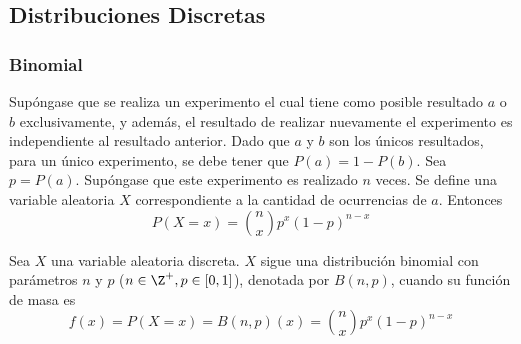 \subsection{Distribuciones Discretas}
\subsubsection{Binomial}
\label{dist:binom}
Supóngase que se realiza un experimento el cual tiene como posible
resultado $a$ o $b$ exclusivamente, y además, el resultado
de realizar nuevamente el experimento es independiente al
resultado anterior. Dado que $a$ y $b$ son los únicos resultados,
para un único experimento, se debe tener que
$P(a) = 1 - P(b)$. Sea $p=P(a)$. Supóngase que
este experimento es realizado $n$ veces. Se define una variable
aleatoria $X$ correspondiente a la cantidad de ocurrencias de $a$.
Entonces
\[P(X=x) = \binom{n}{x}p^x(1-p)^{n-x}\]
\begin{Def}
  Sea $X$ una variable aleatoria discreta. $X$ sigue una distribución
  binomial con parámetros $n$ y $p$ ($n\in\Z^+, p\in[0,1]$), denotada por $B(n,p)$,
  cuando su función de masa es
  \[f(x) = P(X=x) = B(n,p)(x) = \binom{n}{x}p^x(1-p)^{n-x}\]
\end{Def}


